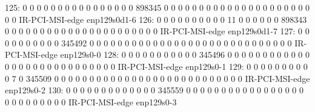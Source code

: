  125:          0          0          0          0          0          0          0          0          0          0          0          0          0          0          0          0     898345          0          0          0          0          0          0          0          0          0          0          0          0          0          0          0          0          0          0          0          0          0          0          0  IR-PCI-MSI-edge      enp129s0d1-6
 126:          0          0          0          0          0          0          0          0          0          0         11          0          0          0          0          0          0     898343          0          0          0          0          0          0          0          0          0          0          0          0          0          0          0          0          0          0          0          0          0          0  IR-PCI-MSI-edge      enp129s0d1-7
 127:          0          0          0          0          0          0          0          0          0          0     345492          0          0          0          0          0          0          0          0          0          0          0          0          0          0          0          0          0          0          0          0          0          0          0          0          0          0          0          0          0  IR-PCI-MSI-edge      enp129s0-0
 128:          0          0          0          0          0          0          0          0          0          0          0     345496          0          0          0          0          0          0          0          0          0          0          0          0          0          0          0          0          0          0          0          0          0          0          0          0          0          0          0          0  IR-PCI-MSI-edge      enp129s0-1
 129:          0          0          0          0          0          0          0          0          0          0          7          0     345509          0          0          0          0          0          0          0          0          0          0          0          0          0          0          0          0          0          0          0          0          0          0          0          0          0          0          0  IR-PCI-MSI-edge      enp129s0-2
 130:          0          0          0          0          0          0          0          0          0          0          0          0          0     345559          0          0          0          0          0          0          0          0          0          0          0          0          0          0          0          0          0          0          0          0          0          0          0          0          0          0  IR-PCI-MSI-edge      enp129s0-3
